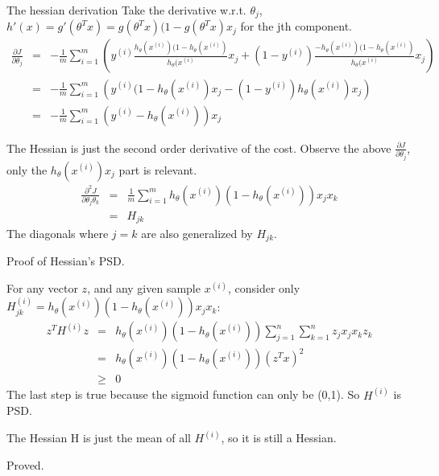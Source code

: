 \begin{answer}

The hessian derivation
Take the derivative w.r.t. $\theta_j$,  $h'(x) = g'(\theta^T x) = g(\theta^T x)(1-g(\theta^T x) x_j$ for the jth component.
\begin{eqnarray*}
    \frac{\partial J}{\partial \theta_j}
	&=& -\frac{1}{m} \sum_{i=1}^m \left(y^{(i)} \frac{h_{\theta}(x^{(i)}) (1-h_{\theta}(x^{(i)})} {h_{\theta}(x^{(i)}} x_j
	+ (1 - y^{(i)}) \frac{-h_{\theta}(x^{(i)})  (1-h_{\theta}(x^{(i)}) } {h_{\theta}(x^{(i)}} x_j \right) \\
	&=& -\frac{1}{m} \sum_{i=1}^m \left(y^{(i)}  (1-h_{\theta}(x^{(i)}) x_j
	- (1 - y^{(i)}) h_{\theta}(x^{(i)}) x_j \right) \\
	&=& -\frac{1}{m} \sum_{i=1}^m (y^{(i)} - h_{\theta}(x^{(i)})) x_j
\end{eqnarray*}

The Hessian is just the second order derivative of the cost. Observe the above $\frac{\partial J}{\partial \theta_j}$, 
only the $ h_{\theta}(x^{(i)}) x_j$ part is relevant.
\begin{eqnarray*}
    \frac{\partial^2 J}{\partial \theta_j \theta_k}
	&=& \frac{1}{m} \sum_{i=1}^m  h_{\theta}(x^{(i)})(1 -  h_{\theta}(x^{(i)})) x_j x_k \\
	&=& H_{jk}
\end{eqnarray*}
The diagonals where $j = k$ are also generalized by $H_{jk}$.

Proof of Hessian's PSD.

For any vector $z$, and any given sample $x^{(i)}$, 
consider only $H^{(i)}_{jk}=h_{\theta}(x^{(i)})(1 -  h_{\theta}(x^{(i)})) x_j x_k$:
\begin{eqnarray*}
z^T H^{(i)} z 
	&=& h_{\theta}(x^{(i)})(1 -  h_{\theta}(x^{(i)})) \sum_{j=1}^n \sum_{k=1}^n z_j x_j x_k z_k \\
	&=& h_{\theta}(x^{(i)})(1 -  h_{\theta}(x^{(i)})) (z^T x)^2 \\
	&\ge& 0
\end{eqnarray*}
The last step is true because the sigmoid function can only be (0,1). So $H^{(i)}$ is PSD.

The Hessian H is just the mean of all  $H^{(i)}$, so it is still a Hessian. 

Proved.

\end{answer}

